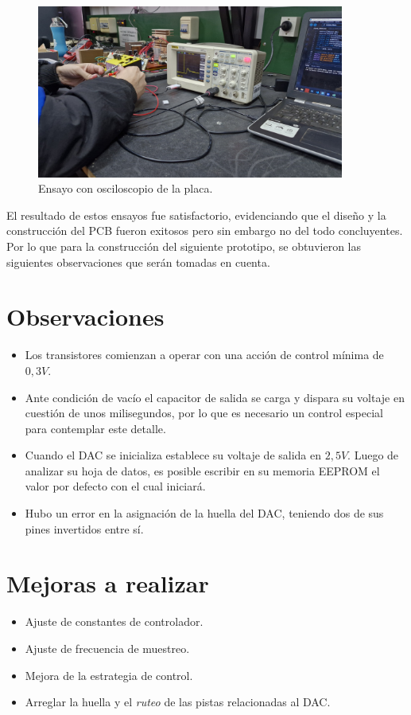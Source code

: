 \begin{figure}[H]
    \centering
    \includegraphics[width=0.9\textwidth]{./imagenes/fotos/osciloscopio.jpg}
    \caption{Ensayo con osciloscopio de la placa.}
    \label{F:esayos_y_pruebas}
\end{figure}
El resultado de estos ensayos fue satisfactorio, evidenciando que el diseño y la construcción del PCB fueron exitosos pero sin embargo no del todo concluyentes. Por lo que para la construcción del siguiente prototipo, se obtuvieron las siguientes observaciones que serán tomadas en cuenta.  \par 
\section*{Observaciones}
\begin{itemize}
    \item Los transistores comienzan a operar con una acción de control mínima de $0,3V$.
    \item Ante condición de vacío el capacitor de salida se carga y dispara su voltaje en cuestión de unos milisegundos, por lo que es necesario un control especial para contemplar este detalle.
    \item Cuando el DAC se inicializa establece su voltaje de salida en $2,5V$. Luego de analizar su hoja de datos, es posible escribir en su memoria EEPROM el valor por defecto con el cual iniciará.
    \item Hubo un error en la asignación de la huella del DAC, teniendo dos de sus pines invertidos entre sí.
\end{itemize}

\section*{Mejoras a realizar}
\begin{itemize}
    \item Ajuste de constantes de controlador.
    \item Ajuste de frecuencia de muestreo.
    \item Mejora de la estrategia de control.
    \item Arreglar la huella y el \textit{ruteo} de las pistas relacionadas al DAC.
\end{itemize}

